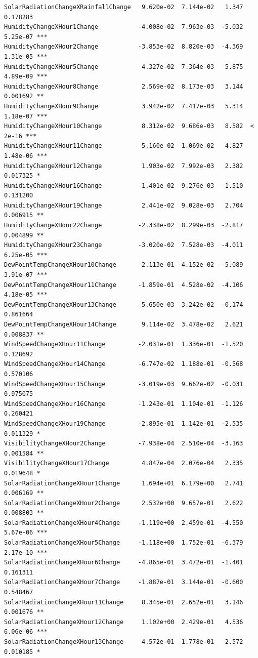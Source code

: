 \documentclass[
  letterpaper,
  DIV=11,
  numbers=noendperiod]{scrartcl}
\begin{document}
\begin{verbatim}
SolarRadiationChangeXRainfallChange   9.620e-02  7.144e-02   1.347 0.178283    
HumidityChangeXHour1Change           -4.008e-02  7.963e-03  -5.032 5.25e-07 ***
HumidityChangeXHour2Change           -3.853e-02  8.820e-03  -4.369 1.31e-05 ***
HumidityChangeXHour5Change            4.327e-02  7.364e-03   5.875 4.89e-09 ***
HumidityChangeXHour8Change            2.569e-02  8.173e-03   3.144 0.001692 ** 
HumidityChangeXHour9Change            3.942e-02  7.417e-03   5.314 1.18e-07 ***
HumidityChangeXHour10Change           8.312e-02  9.686e-03   8.582  < 2e-16 ***
HumidityChangeXHour11Change           5.160e-02  1.069e-02   4.827 1.48e-06 ***
HumidityChangeXHour12Change           1.903e-02  7.992e-03   2.382 0.017325 *  
HumidityChangeXHour16Change          -1.401e-02  9.276e-03  -1.510 0.131200    
HumidityChangeXHour19Change           2.441e-02  9.028e-03   2.704 0.006915 ** 
HumidityChangeXHour22Change          -2.338e-02  8.299e-03  -2.817 0.004899 ** 
HumidityChangeXHour23Change          -3.020e-02  7.528e-03  -4.011 6.25e-05 ***
DewPointTempChangeXHour10Change      -2.113e-01  4.152e-02  -5.089 3.91e-07 ***
DewPointTempChangeXHour11Change      -1.859e-01  4.528e-02  -4.106 4.18e-05 ***
DewPointTempChangeXHour13Change      -5.650e-03  3.242e-02  -0.174 0.861664    
DewPointTempChangeXHour14Change       9.114e-02  3.478e-02   2.621 0.008837 ** 
WindSpeedChangeXHour11Change         -2.031e-01  1.336e-01  -1.520 0.128692    
WindSpeedChangeXHour14Change         -6.747e-02  1.188e-01  -0.568 0.570106    
WindSpeedChangeXHour15Change         -3.019e-03  9.662e-02  -0.031 0.975075    
WindSpeedChangeXHour16Change         -1.243e-01  1.104e-01  -1.126 0.260421    
WindSpeedChangeXHour19Change         -2.895e-01  1.142e-01  -2.535 0.011329 *  
VisibilityChangeXHour2Change         -7.938e-04  2.510e-04  -3.163 0.001584 ** 
VisibilityChangeXHour17Change         4.847e-04  2.076e-04   2.335 0.019648 *  
SolarRadiationChangeXHour1Change      1.694e+01  6.179e+00   2.741 0.006169 ** 
SolarRadiationChangeXHour2Change      2.532e+00  9.657e-01   2.622 0.008803 ** 
SolarRadiationChangeXHour4Change     -1.119e+00  2.459e-01  -4.550 5.67e-06 ***
SolarRadiationChangeXHour5Change     -1.118e+00  1.752e-01  -6.379 2.17e-10 ***
SolarRadiationChangeXHour6Change     -4.865e-01  3.472e-01  -1.401 0.161311    
SolarRadiationChangeXHour7Change     -1.887e-01  3.144e-01  -0.600 0.548467    
SolarRadiationChangeXHour11Change     8.345e-01  2.652e-01   3.146 0.001676 ** 
SolarRadiationChangeXHour12Change     1.102e+00  2.429e-01   4.536 6.06e-06 ***
SolarRadiationChangeXHour13Change     4.572e-01  1.778e-01   2.572 0.010185 *  

\end{verbatim}
\end{document}
